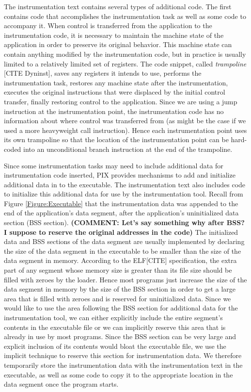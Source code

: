 The instrumentation text contains several types of additional code. The first
contains code that accomplishes the instrumentation task as well as some code to
accompany it. When control is transferred from the application to the
instrumentation code, it is necessary to maintain the machine state of
the application in order to preserve its original behavior. This machine state
can contain anything modified by the instrumentation code, but in practice is
usually limited to a relatively limited set of registers. The code snippet, called \textit{trampoline} [CITE Dyninst], 
saves any registers it intends to use, performs the instrumentation task, restores
any machine state after the instrumentation, executes the
original instructions that were displaced by the initial control transfer,
finally restoring control to the application. Since we are using a jump instruction at the instrumentation point, the
instrumentation code has no information about where control was transferred from
(as might be the case if we used a more heavyweight call instruction). Hence
each instrumentation point uses its own trampoline so that the location of the
instrumentation point can be hard-coded into an unconditional branch instruction
at the end of the trampoline.

Since some instrumentation tasks may need to include additional data for instrumentation code inserted,
PIX provides mechanisms to add and initialize additional data in to the executable.
The instrumentation text also includes code to initialize this additional data for use by the
instrumentation tool. Recall from Figure \ref{Figure:Executable} that the instrumentation
data was appended to the end of the application's data segment, after the
application's uninitialized data section  (BSS section). \textbf{(COMMENT: Let's say something why after BSS? I suppose
to reserve the original addresses in the code)} The initialized data and BSS
sections of the data segment are usually implemented by declaring the size of
the data segment in the executable to be smaller than the size of the data
segment in memory. According to the ELF[CITE] specification, the extra part of any
segment whose memory size is greater than its file size should be filled with
zeroes by the loader. Hence most programs just increase the size of the data
segment in memory by the size of the BSS section in order to get a large
area that is filled with zeroes and is reserved for uninitialized data. Since we
would like to use the area following the BSS section for additional
data for the instrumentation tool, we can either explicitly include the entire
segment's contents in the executable file or we can implicitly reserve this area
that is already in use by most programs.
Since the BSS section can be very large and explicit inclusion of its contents
would bloat the  executable file, we use the implicit
technique to reserve this section for instrumentation data. We therefore
temporarily store the instrumentation data with the instrumentation text in the
executable, as well as some code to copy it to the appropriate location in the
data segment once the program starts.
